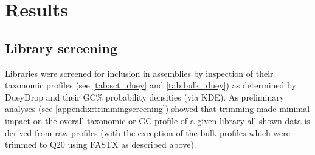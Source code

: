 \section{Results} 

\subsection{Library screening}

Libraries were screened for inclusion in assemblies by inspection of their taxonomic
profiles (see \ref{tab:sct_duey} and \ref{tab:bulk_duey}) as determined by DueyDrop 
and their GC\% probability densities (via KDE).
As preliminary analyses (see \ref{appendix:trimmingscreening}) showed 
that trimming made minimal impact on the overall
taxonomic or GC profile of a given library all shown data is derived from raw profiles 
(with the exception of the bulk profiles which were trimmed to Q20 using
FASTX as described above).

